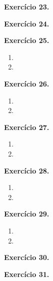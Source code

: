 \documentclass[12pt,a4paper]{article}
\begin{document}
\vspace{0.5cm}
\noindent\textbf{Exercício 23.}

\vspace{0.5cm}
\noindent\textbf{Exercício 24.}

\vspace{0.5cm}
\noindent\textbf{Exercício 25.}
\begin{enumerate}
    \renewcommand{\theenumi}{\alph{enumi}}
    \renewcommand{\labelenumi}{\theenumi)}
    \item 
    \item 
\end{enumerate}

\vspace{0.5cm}
\noindent\textbf{Exercício 26.}
\begin{enumerate}
    \renewcommand{\theenumi}{\alph{enumi}}
    \renewcommand{\labelenumi}{\theenumi)}
    \item 
    \item 
\end{enumerate}

\vspace{0.5cm}
\noindent\textbf{Exercício 27.}
\begin{enumerate}
    \renewcommand{\theenumi}{\alph{enumi}}
    \renewcommand{\labelenumi}{\theenumi)}
    \item 
    \item 
\end{enumerate}

\vspace{0.5cm}
\noindent\textbf{Exercício 28.}
\begin{enumerate}
    \renewcommand{\theenumi}{\alph{enumi}}
    \renewcommand{\labelenumi}{\theenumi)}
    \item 
    \item 
\end{enumerate}

\vspace{0.5cm}
\noindent\textbf{Exercício 29.}
\begin{enumerate}
    \renewcommand{\theenumi}{\alph{enumi}}
    \renewcommand{\labelenumi}{\theenumi)}
    \item 
    \item 
\end{enumerate}

\vspace{0.5cm}
\noindent\textbf{Exercício 30.}

\vspace{0.5cm}
\noindent\textbf{Exercício 31.}
\end{document}
